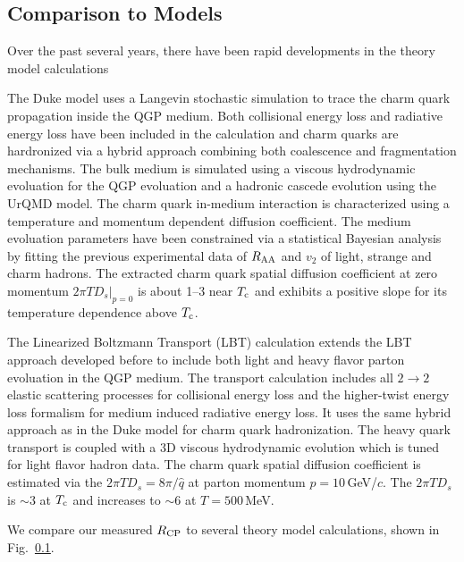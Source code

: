 \subsection{\label{result:theory}Comparison to Models}

Over the past several years, there have been rapid developments in the theory model calculations 

The Duke model uses a Langevin stochastic simulation to trace the charm quark propagation inside the QGP medium. Both collisional energy loss and radiative energy loss have been included in the calculation and charm quarks are hardronized via a hybrid approach combining both coalescence and fragmentation mechanisms. The bulk medium is simulated using a viscous hydrodynamic evoluation for the QGP evoluation and a hadronic cascede evolution using the UrQMD model. The charm quark in-medium interaction is characterized using a temperature and momentum dependent diffusion coefficient. The medium evoluation parameters have been constrained via a statistical Bayesian analysis by fitting the previous experimental data of $R_{\rm AA}$ and $v_{2}$ of light, strange and charm hadrons. The extracted charm quark spatial diffusion coefficient at zero momentum $2\pi TD_s|_{p=0}$ is about 1--3 near $T_{\rm c}$ and exhibits a positive slope for its temperature dependence above $T_{\rm c}$.

The Linearized Boltzmann Transport (LBT) calculation extends the LBT approach developed before to include both light and heavy flavor parton evoluation in the QGP medium. The transport calculation includes all $2\rightarrow 2$ elastic scattering processes for collisional energy loss and the higher-twist energy loss formalism for medium induced radiative energy loss. It uses the same hybrid approach as in the Duke model for charm quark hadronization. The heavy quark transport is coupled with a 3D viscous hydrodynamic evolution which is tuned for light flavor hadron data. The charm quark spatial diffusion coefficient is estimated via the $2\pi TD_s =8\pi/\hat{q}$ at parton momentum $p = 10$\,GeV/$c$. The $2\pi TD_s$ is $\sim$3 at $T_{\rm c}$ and increases to $\sim$6 at $T = 500$\,MeV.

We compare our measured $R_{\rm CP}$ to several theory model calculations, shown in Fig.~\ref{}. 

